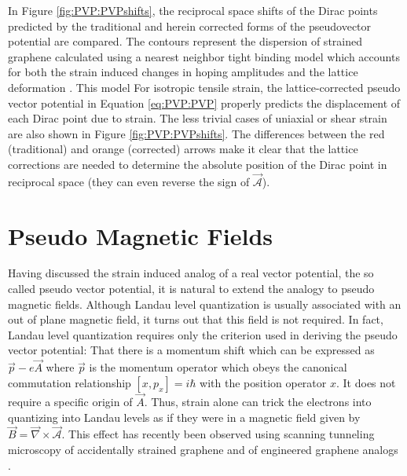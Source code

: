 In Figure \ref{fig:PVP:PVPshifts}, the reciprocal space shifts of the Dirac points predicted by the traditional and herein corrected forms of the pseudovector potential are compared.
The contours represent the dispersion of strained graphene calculated using a nearest neighbor tight binding model which accounts for both the strain induced changes in hoping amplitudes and the lattice deformation \cite{Pereira2009}.
This model 
For isotropic tensile strain, the lattice-corrected pseudo vector potential in Equation \ref{eq:PVP:PVP} properly predicts the displacement of each Dirac point due to strain.
The less trivial cases of uniaxial or shear strain are also shown in Figure \ref{fig:PVP:PVPshifts}.
The differences between the red (traditional) and orange (corrected) arrows make it clear that the lattice corrections are needed to determine the absolute position of the Dirac point in reciprocal space (they can even reverse the sign of $\vec{\mathcal{A}}$).

\section{Pseudo Magnetic Fields}
Having discussed the strain induced analog of a real vector potential, the so called pseudo vector potential, it is natural to extend the analogy to pseudo magnetic fields.
Although Landau level quantization is usually associated with an out of plane magnetic field, it turns out that this field is not required.
In fact, Landau level quantization \cite{Goerbig2011} requires only the criterion used in deriving the pseudo vector potential: That there is a momentum shift which can be expressed as $\vec{p}-e\vec{A}$ where $\vec{p}$ is the momentum operator which obeys the canonical commutation relationship $[x,p_x]=i \hbar$ with the position operator $x$.
It does not require a specific origin of $\vec{A}$.
Thus, strain alone can trick the electrons into quantizing into Landau levels as if they were in a magnetic field given by $\vec{B}=\vec{\nabla}\times\vec{\mathcal{A}}$.
This effect has recently been observed using scanning tunneling microscopy of accidentally strained graphene \cite{Levy2010,Yan2012,Yeh2011} and of engineered graphene analogs \cite{Gomes2012}.


